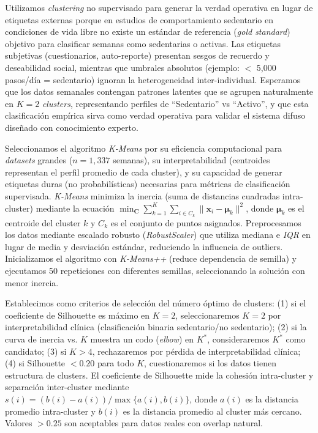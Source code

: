Utilizamos \textit{clustering} no supervisado para generar la verdad operativa en lugar de etiquetas externas porque en estudios de comportamiento sedentario en condiciones de vida libre no existe un estándar de referencia (\textit{gold standard}) objetivo para clasificar semanas como sedentarias o activas. Las etiquetas subjetivas (cuestionarios, auto-reporte) presentan sesgos de recuerdo y deseabilidad social, mientras que umbrales absolutos (ejemplo: $<$ 5,000 pasos/día = sedentario) ignoran la heterogeneidad inter-individual. Esperamos que los datos semanales contengan patrones latentes que se agrupen naturalmente en $K=2$ \textit{clusters}, representando perfiles de ``Sedentario'' vs ``Activo'', y que esta clasificación empírica sirva como verdad operativa para validar el sistema difuso diseñado con conocimiento experto.

Seleccionamos el algoritmo \textit{K-Means} por su eficiencia computacional para \textit{datasets} grandes ($n=1,337$ semanas), su interpretabilidad (centroides representan el perfil promedio de cada cluster), y su capacidad de generar etiquetas duras (no probabilísticas) necesarias para métricas de clasificación supervisada. \textit{K-Means} minimiza la inercia (suma de distancias cuadradas intra-cluster) mediante la ecuación $\min_{\mathbf{C}} \sum_{k=1}^{K} \sum_{i \in C_k} \|\mathbf{x}_i - \boldsymbol{\mu}_k\|^2$, donde $\boldsymbol{\mu}_k$ es el centroide del cluster $k$ y $C_k$ es el conjunto de puntos asignados. Preprocesamos los datos mediante escalado robusto (\textit{RobustScaler}) que utiliza mediana e \textit{IQR} en lugar de media y desviación estándar, reduciendo la influencia de outliers. Inicializamos el algoritmo con \textit{K-Means++} (reduce dependencia de semilla) y ejecutamos 50 repeticiones con diferentes semillas, seleccionando la solución con menor inercia.

Establecimos como criterios de selección del número óptimo de clusters: (1) si el coeficiente de Silhouette es máximo en $K=2$, seleccionaremos $K=2$ por interpretabilidad clínica (clasificación binaria sedentario/no sedentario); (2) si la curva de inercia vs. $K$ muestra un codo (\textit{elbow}) en $K^*$, consideraremos $K^*$ como candidato; (3) si $K > 4$, rechazaremos por pérdida de interpretabilidad clínica; (4) si Silhouette $< 0.20$ para todo $K$, cuestionaremos si los datos tienen estructura de clusters. El coeficiente de Silhouette mide la cohesión intra-cluster y separación inter-cluster mediante $s(i) = (b(i) - a(i))/\max\{a(i), b(i)\}$, donde $a(i)$ es la distancia promedio intra-cluster y $b(i)$ es la distancia promedio al cluster más cercano. Valores $> 0.25$ son aceptables para datos reales con overlap natural.


